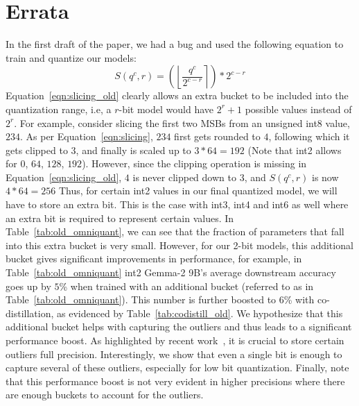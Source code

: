 

\section{Errata}
\label{sec:errata}
In the first draft of the paper, we had a bug and used the following equation to train and quantize our models:
\begin{equation}
\label{eqn:slicing_old}
   S(q^c, r) = \left(\left\lfloor \frac{q^c}{2^{c - r}} \right\rceil\right) * 2^{c - r}
\end{equation}
Equation~\ref{eqn:slicing_old} clearly allows an extra bucket to be included into the quantization range, i.e, a $r$-bit model would have $2^r + 1$ possible values instead of $2^r$. For example, consider slicing the first two MSBs from an unsigned int8 value, $234$. As per Equation~\ref{eqn:slicing}, $234$ first gets rounded to $4$, following which it gets clipped to $3$, and finally is scaled up to $3 * 64 = 192$ (Note that \alg int2 allows for $0$, $64$, $128$, $192$). However, since the clipping operation is missing in Equation~\ref{eqn:slicing_old}, $4$ is never clipped down to $3$, and $S(q^c, r)$ is now $4 * 64 = 256$ Thus, for certain int2 values in our final quantized model, we will have to store an extra bit. This is the case with int3, int4 and int6 as well where an extra bit is required to represent certain values. In Table~\ref{tab:old_omniquant}, we can see that the fraction of parameters that fall into this extra bucket is very small. However, for our 2-bit models, this additional bucket gives significant improvements in performance, for example, in Table~\ref{tab:old_omniquant} int2 Gemma-2 9B's average downstream accuracy goes up by $5$\% when trained with an additional bucket (referred to as \epalg in Table~\ref{tab:old_omniquant}). This number is further boosted to $6$\% with co-distillation, as evidenced by Table~\ref{tab:codistill_old}. We hypothesize that this additional bucket helps with capturing the outliers and thus leads to a significant performance boost. As highlighted by recent work~\citep{dettmers2023spqr, squeezellm}, it is crucial to store certain outliers full precision. Interestingly, we show that even a single bit is enough to capture several of these outliers, especially for low bit quantization. Finally, note that this performance boost is not very evident in higher precisions where there are enough buckets to account for the outliers.



